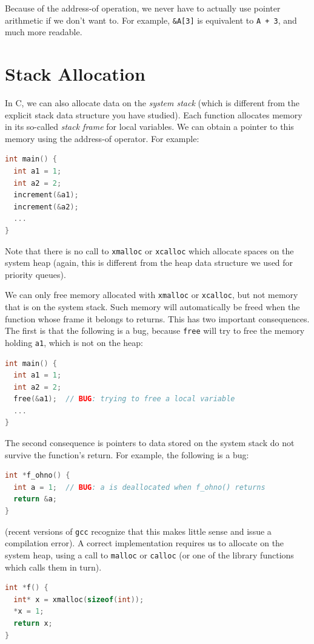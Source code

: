Because of the address-of operation, we never have to actually use
pointer arithmetic if we don't want to.  For example,
\lstinline'&A[3]' is equivalent to \lstinline'A + 3', and much more readable.


\section{Stack Allocation}
\label{sec:stack_allocation}


In C, we can also allocate data on the \emph{system stack} (which is
different from the explicit stack data structure you have studied).
Each function allocates memory in its so-called \emph{stack frame} for
local variables.  We can obtain a pointer to this memory using the
address-of operator.  For example:
\begin{lstlisting}[language=c]
int main() {
  int a1 = 1;
  int a2 = 2;
  increment(&a1);
  increment(&a2);
  ...
}
\end{lstlisting}
Note that there is no call to \lstinline'xmalloc' or \lstinline'xcalloc' which
allocate spaces on the system heap (again, this is different from the
heap data structure we used for priority queues).

We can only free memory allocated with \lstinline'xmalloc'
or \lstinline'xcalloc', but not memory that is on the system stack.
Such memory will automatically be freed when the function whose
frame it belongs to returns.  This has two important consequences.
The first is that the following is a bug, because \lstinline'free'
will try to free the memory holding \lstinline'a1', which is
not on the heap:
\begin{lstlisting}[language=c]
int main() {
  int a1 = 1;
  int a2 = 2;
  free(&a1);  // BUG: trying to free a local variable
  ...
}
\end{lstlisting}
The second consequence is pointers to data stored on the system stack
do not survive the function's return.  For example, the following is a
bug:
\begin{lstlisting}[language=c]
int *f_ohno() {
  int a = 1;  // BUG: a is deallocated when f_ohno() returns
  return &a;
}
\end{lstlisting}
(recent versions of \lstinline'gcc' recognize that this makes little
sense and issue a compilation error).  A correct implementation
requires us to allocate on the system heap, using a call to
\lstinline'malloc' or \lstinline'calloc' (or one of the library
functions which calls them in turn).
\begin{lstlisting}[language=c]
int *f() {
  int* x = xmalloc(sizeof(int));
  *x = 1;
  return x;
}
\end{lstlisting}

